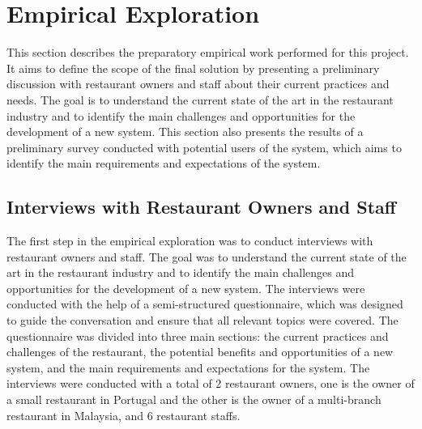 \section{Empirical Exploration}
This section describes the preparatory empirical work performed for this project. It aims to define the scope of the final solution by presenting a preliminary discussion with restaurant owners and staff about their current practices and needs. The goal is to understand the current state of the art in the restaurant industry and to identify the main challenges and opportunities for the development of a new system. This section also presents the results of a preliminary survey conducted with potential users of the system, which aims to identify the main requirements and expectations of the system.

\subsection*{Interviews with Restaurant Owners and Staff}
The first step in the empirical exploration was to conduct interviews with restaurant owners and staff. The goal was to understand the current state of the art in the restaurant industry and to identify the main challenges and opportunities for the development of a new system. The interviews were conducted with the help of a semi-structured questionnaire, which was designed to guide the conversation and ensure that all relevant topics were covered. The questionnaire was divided into three main sections: the current practices and challenges of the restaurant, the potential benefits and opportunities of a new system, and the main requirements and expectations for the system. The interviews were conducted with a total of 2 restaurant owners, one is the owner of a small restaurant in Portugal and the other is the owner of a multi-branch restaurant in Malaysia, and 6 restaurant staffs.

